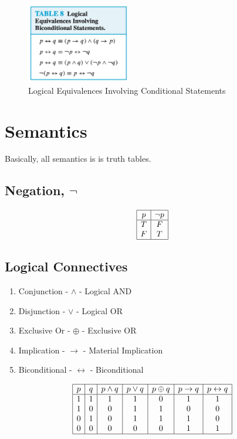 \documentclass[12pt]{article}
\begin{document}
\begin{figure}[H]
    \centering
    \includegraphics[width=0.4\textwidth]{"./Logical Equivalences Involving Biconditional Statements.jpg"}
    \caption{Logical Equivalences Involving Conditional Statements}
    \label{fig:logical_equivalences_biconditional}
\end{figure}

\section{Semantics}

Basically, all semantics is is truth tables.

\subsection{Negation, $\neg$}

\[
\begin{array}{|c|c|}
\hline
p & \neg p \\
\hline
T & F \\
F & T \\
\hline
\end{array}
\]

\subsection{Logical Connectives}

\begin{enumerate}
  \item Conjunction - $\land$ - Logical AND
  \item Disjunction - $\lor$ - Logical OR
  \item Exclusive Or - $\oplus$ - Exclusive OR
  \item Implication - $\to$ - Material Implication
  \item Biconditional - $\leftrightarrow$ - Biconditional
\end{enumerate}

\[
\begin{array}{|c|c|c|c|c|c|c|}
\hline
p & q & p \land q & p \lor q & p \oplus q & p \to q & p \leftrightarrow q \\
\hline
1 & 1 & 1 & 1 & 0 & 1 & 1 \\
1 & 0 & 0 & 1 & 1 & 0 & 0 \\
0 & 1 & 0 & 1 & 1 & 1 & 0 \\
0 & 0 & 0 & 0 & 0 & 1 & 1 \\
\hline
\end{array}
\]
\end{document}
